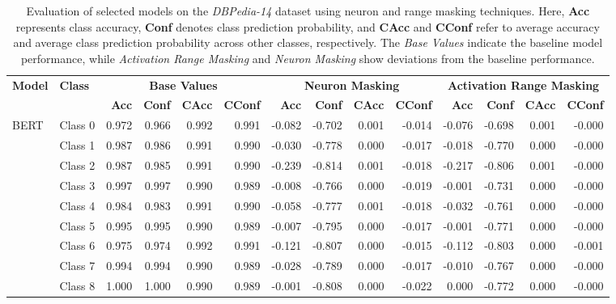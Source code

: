 \begin{table*}[t]
\caption{Evaluation of selected models on the \textit{DBPedia-14} dataset using neuron and range masking techniques. Here, \textbf{Acc} represents class accuracy, \textbf{Conf} denotes class prediction probability, and \textbf{CAcc} and \textbf{CConf} refer to average accuracy and average class prediction probability across other classes, respectively. The \textit{Base Values} indicate the baseline model performance, while \textit{Activation Range Masking} and \textit{Neuron Masking} show deviations from the baseline performance.}
\centering
\scriptsize
\begin{tabular}{l|l|rrrr|rrrr|rrrr}
\toprule
\textbf{Model} & \textbf{Class} & \multicolumn{4}{c|}{\textbf{Base Values}} & \multicolumn{4}{c|}{\textbf{Neuron Masking}} & \multicolumn{4}{c}{\textbf{Activation Range Masking}} \\
\cmidrule(r){2-5} \cmidrule(r){6-9} \cmidrule{10-14}
&  & \textbf{Acc} & \textbf{Conf} & \textbf{CAcc} & \textbf{CConf} & \textbf{Acc} & \textbf{Conf} & \textbf{CAcc} & \textbf{CConf} & \textbf{Acc} & \textbf{Conf} & \textbf{CAcc} & \textbf{CConf} \\
\midrule
\multirow{14}{*}{BERT} 
&Class 0 & 0.972 & 0.966 & 0.992 & 0.991 & -0.082 & -0.702 & 0.001 & -0.014 & -0.076 & -0.698 & 0.001 & -0.000 \\
&Class 1 & 0.987 & 0.986 & 0.991 & 0.990 & -0.030 & -0.778 & 0.000 & -0.017 & -0.018 & -0.770 & 0.000 & -0.000 \\
&Class 2 & 0.987 & 0.985 & 0.991 & 0.990 & -0.239 & -0.814 & 0.001 & -0.018 & -0.217 & -0.806 & 0.001 & -0.000 \\
&Class 3 & 0.997 & 0.997 & 0.990 & 0.989 & -0.008 & -0.766 & 0.000 & -0.019 & -0.001 & -0.731 & 0.000 & -0.000 \\
&Class 4 & 0.984 & 0.983 & 0.991 & 0.990 & -0.058 & -0.777 & 0.001 & -0.018 & -0.032 & -0.761 & 0.000 & -0.000 \\
&Class 5 & 0.995 & 0.995 & 0.990 & 0.989 & -0.007 & -0.795 & 0.000 & -0.017 & -0.001 & -0.771 & 0.000 & -0.000 \\
&Class 6 & 0.975 & 0.974 & 0.992 & 0.991 & -0.121 & -0.807 & 0.000 & -0.015 & -0.112 & -0.803 & 0.000 & -0.001 \\
&Class 7 & 0.994 & 0.994 & 0.990 & 0.989 & -0.028 & -0.789 & 0.000 & -0.017 & -0.010 & -0.767 & 0.000 & -0.000 \\
&Class 8 & 1.000 & 1.000 & 0.990 & 0.989 & -0.001 & -0.808 & 0.000 & -0.022 & 0.000 & -0.772 & 0.000 & -0.000 \\

\end{tabular}
\end{table*}
